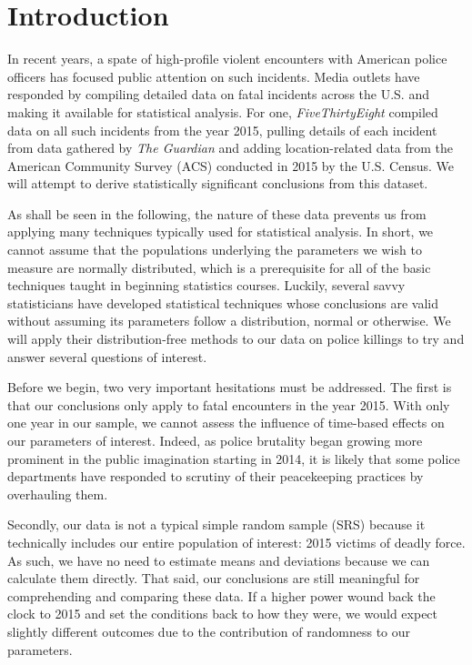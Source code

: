 
\section{Introduction}

\par In recent years, a spate of high-profile violent encounters with American police officers has focused public attention on such incidents. Media outlets have responded by compiling detailed data on fatal incidents across the U.S. and making it available for statistical analysis. For one, \textit{FiveThirtyEight} compiled data on all such incidents from the year 2015, pulling details of each incident from data gathered by \textit{The Guardian} and adding location-related data from the American Community Survey (ACS) conducted in 2015 by the U.S. Census.\cite{dset} We will attempt to derive statistically significant conclusions from this dataset.

\par \bigskip As shall be seen in the following, the nature of these data prevents us from applying many techniques typically used for statistical analysis. In short, we cannot assume that the populations underlying the parameters we wish to measure are normally distributed, which is a prerequisite for all of the basic techniques taught in beginning statistics courses. Luckily, several savvy statisticians have developed statistical techniques whose conclusions are valid without assuming its parameters follow a distribution, normal or otherwise. We will apply their distribution-free methods to our data on police killings to try and answer several questions of interest.

\par \bigskip Before we begin, two very important hesitations must be addressed. The first is that our conclusions only apply to fatal encounters in the year 2015. With only one year in our sample, we cannot assess the influence of time-based effects on our parameters of interest. Indeed, as police brutality began growing more prominent in the public imagination starting in 2014, it is likely that some police departments have responded to scrutiny of their peacekeeping practices by overhauling them.

\par \bigskip Secondly, our data is not a typical simple random sample (SRS) because it technically includes our entire population of interest: 2015 victims of deadly force. As such, we have no need to estimate means and deviations because we can calculate them directly. That said, our conclusions are still meaningful for comprehending and comparing these data. If a higher power wound back the clock to 2015 and set the conditions back to how they were, we would expect slightly different outcomes due to the contribution of randomness to our parameters. 

